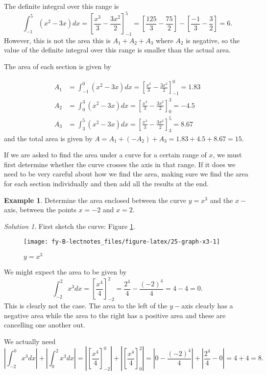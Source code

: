 \documentclass[
  11pt,
  oneside]{book}
\newcommand{\slide}{}
\theoremstyle{definition}
\theoremstyle{definition}
\newtheorem{example}{Example}[chapter]
\theoremstyle{definition}
\theoremstyle{definition}
\theoremstyle{remark}
\newtheorem*{solution}{Solution}
\begin{document}
The definite integral over this range is
\[
\int_{-1}^5(x^2-3x)dx = \left[\frac{x^3}3-\frac{3x^2}2\right]_{-1}^5 = \left[\frac{125}3-\frac{75}2\right]-\left[\frac{-1}3-\frac{3}2\right]=6.
\]
However, this is not the area this is \(A_1 + A_2 + A_3\) where \(A_2\) is negative, so the value of the definite integral over this range is smaller than the actual area.

The area of each section is given by

\begin{align*}
A_1&=\int_{-1}^0(x^2-3x)dx = \left[\frac{x^3}3-\frac{3x^2}2\right]_{-1}^0 = 1.83\\
A_2&=\int_{0}^3(x^2-3x)dx = \left[\frac{x^3}3-\frac{3x^2}2\right]_{0}^3 = -4.5\\
A_3&=\int_{3}^5(x^2-3x)dx = \left[\frac{x^3}3-\frac{3x^2}2\right]_{3}^5 = 8.67
\end{align*}
and the total area is given by \(A = A_1 + (-A_2) + A_3 = 1.83 + 4.5 + 8.67 = 15\).

If we are asked to find the area under a curve for a certain range of \(x\), we must first determine whether the curve crosses the axis in that range. If it does we need to be very careful about how we find the area, making sure we find the area for each section individually and then add all the results at the end.

\slide

\begin{example}
Determine the area enclosed between the curve \(y=x^3\) and the \(x-\)axis, between the points \(x=-2\) and \(x=2\).
\end{example}

\begin{solution}
First sketch the curve: Figure \ref{fig:25-graph-x3}.

\begin{figure}

{\centering \texttt{[image: fy-B-lectnotes\_files/figure-latex/25-graph-x3-1]} 

}

\caption{$y=x^3$}\label{fig:25-graph-x3}
\end{figure}

We might expect the area to be given by
\[
\int_{-2}^2x^3dx = \left[\frac{x^4}4\right]_{-2}^2 = \frac{2^4}4-\frac{(-2)^4}4 = 4-4 = 0.
\]
This is clearly not the case. The area to the left of the \(y-\)axis clearly has a negative area while the area to the right has a positive area and these are cancelling one another out.

We actually need
\[
\left|\int_{-2}^0x^3dx\right|+\left|\int_0^2x^3dx\right| = \left|\left[\frac{x^4}4\right]_{-2}^0\right|+\left|\left[\frac{x^4}4\right]_{0}^2\right| = \left|0-\frac{(-2)^4}4\right|+\left|\frac{2^4}4-0\right| = 4+4=8.
\]
\end{solution}
\end{document}
